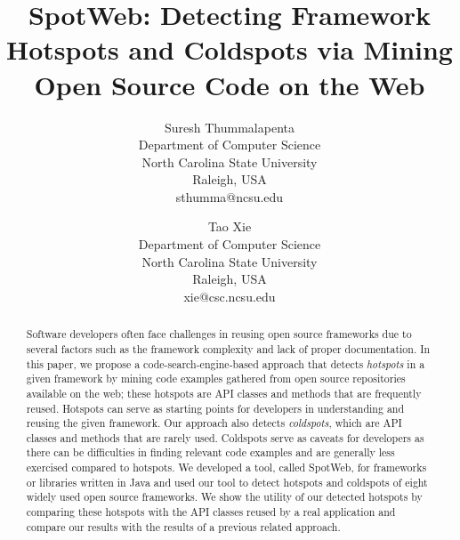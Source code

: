 \documentclass[conference]{IEEEtran}
\newcommand{\Intro}[1]{\emph{#1}}
\begin{document}
\title{SpotWeb: Detecting Framework Hotspots and Coldspots via Mining Open Source Code on the Web}

\author{Suresh Thummalapenta\\
Department of Computer Science\\ North Carolina State University \\
Raleigh, USA\\ sthumma@ncsu.edu\\
\and
Tao Xie\\
Department of Computer Science\\ North Carolina State University \\
Raleigh, USA\\ xie@csc.ncsu.edu\\
}

\maketitle
\thispagestyle{empty}

\begin{abstract}

Software developers often face
challenges in reusing open source frameworks due to several factors
such as the framework complexity and lack of proper
documentation. In this paper, we propose a code-search-engine-based
approach that detects \Intro{hotspots} in a given framework
by mining code examples gathered from open source repositories available on the web; 
these hotspots are API classes and methods that are frequently reused. 
Hotspots can serve as starting points for developers
in understanding and reusing the given framework. 
Our approach also detects \Intro{coldspots}, which are API classes and methods that are rarely used.
Coldspots serve as caveats for developers as there can 
be difficulties in finding relevant code examples and are generally less exercised
compared to hotspots. We developed a tool, called SpotWeb, for
frameworks or libraries written in Java and used our tool
to detect hotspots and coldspots of eight widely used open source
frameworks. We show the utility of our detected hotspots 
by comparing these hotspots with the API classes reused by a real application
and compare our results with the results of a previous related approach.
\end{abstract}
\end{document}
